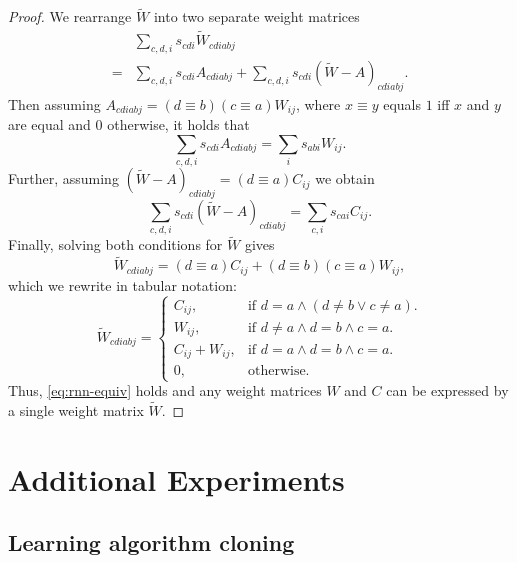 \documentclass{article}
\begin{document}
\begin{proof}
We rearrange $\tilde W$ into two separate weight matrices
\begin{align}
    & \sum_{c,d,i} s_{cdi} \tilde W_{cdiabj} \\
    = & \sum_{c,d,i} s_{cdi} A_{cdiabj} + \sum_{c,d,i} s_{cdi} (\tilde W - A)_{cdiabj}. \label{eq:separated_tildeW}
\end{align}
Then assuming $A_{cdiabj} = (d \equiv b)(c \equiv a) W_{ij}$, where $x \equiv y$ equals $1$ iff $x$ and $y$ are equal and $0$ otherwise, it holds that
\begin{equation}
    \sum_{c,d,i} s_{cdi} A_{cdiabj} = \sum_i s_{abi} W_{ij}.
\end{equation}
Further, assuming $(\tilde W - A)_{cdiabj} = (d \equiv a) C_{ij}$ we obtain
\begin{equation}
    \sum_{c,d,i} s_{cdi} (\tilde W - A)_{cdiabj} = \sum_{c,i} s_{cai} C_{ij}.
\end{equation}
Finally, solving both conditions for $\tilde W$ gives
\begin{equation}
    \tilde W_{cdiabj} = (d \equiv a) C_{ij} + (d \equiv b)(c \equiv a)W_{ij},
\end{equation}
which we rewrite in tabular notation:
\begin{equation}
    \tilde W_{cdiabj} = \begin{cases}
        C_{ij}, & \text{if } d = a \land ( d \neq b \lor c \neq a ). \\
        W_{ij}, & \text{if } d \neq a \land d = b \land c = a. \\
        C_{ij} + W_{ij}, & \text{if } d = a \land d = b \land c = a. \\
        0, & \text{otherwise.}
    \end{cases}
\end{equation}
Thus, \autoref{eq:rnn-equiv} holds and any weight matrices $W$ and $C$ can be expressed by a single weight matrix $\tilde W$.
\end{proof}

\newpage
\section{Additional Experiments}\label{sec:additional-experiments}

\subsection{Learning algorithm cloning}
\end{document}
